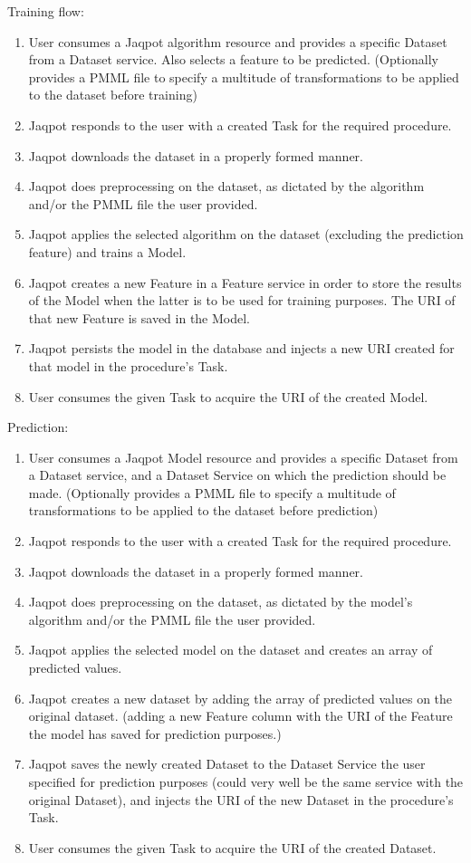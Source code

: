 \noindent Training flow:
\begin{enumerate}
 \item 	User consumes a Jaqpot algorithm resource and provides a 
	specific Dataset from a Dataset service. Also selects a feature to be 
	predicted. (Optionally provides a PMML file to specify a multitude of 
	transformations to be applied to the dataset before training)
\item  Jaqpot responds to the user with a created Task for the required procedure.
\item   Jaqpot downloads the dataset in a properly formed manner.
 \item  Jaqpot does preprocessing on the dataset, as dictated by the algorithm and/or the PMML file the user provided.
 \item  Jaqpot applies the selected algorithm on the dataset (excluding the prediction feature) and trains a Model. 
 \item  Jaqpot creates a new Feature in a Feature service in order to store the results of the Model when the latter is to be used for training purposes. The URI of that new Feature is saved in the Model.
 \item  Jaqpot persists the model in the database and injects a new URI created for that model in the procedure’s Task.
 \item  User consumes the given Task to acquire the URI of the created Model.
\end{enumerate}

 
 
 
\noindent Prediction:
\begin{enumerate}
\item  User consumes a Jaqpot Model resource and provides a specific Dataset from a Dataset service, and a Dataset Service on which the prediction should be made. (Optionally provides a PMML file to specify a multitude of transformations to be applied to the dataset before prediction)
\item Jaqpot responds to the user with a created Task for the required procedure.
\item Jaqpot downloads the dataset in a properly formed manner.
\item Jaqpot does preprocessing on the dataset, as dictated by the model’s algorithm and/or the PMML file the user provided.
\item Jaqpot applies the selected model on the dataset and creates an array of predicted values.
\item Jaqpot creates a new dataset by adding the array of predicted values on the original dataset. (adding a new Feature column with the URI of the Feature the model has saved for prediction purposes.)
\item Jaqpot saves the newly created Dataset to the Dataset Service the user specified for prediction purposes (could very well be the same service with the original Dataset), and injects the URI of the new Dataset in the procedure’s Task.
\item User consumes the given Task to acquire the URI of the created Dataset.
\end{enumerate}

